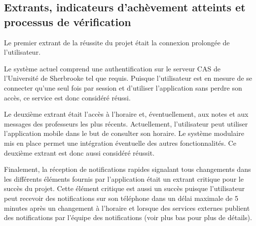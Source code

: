     \pagebreak
    \subsection{Extrants, indicateurs d'achèvement atteints et processus de vérification}
    Le premier extrant de la réussite du projet était la connexion prolongée de l'utilisateur.

    Le système actuel comprend une authentification sur le serveur CAS de l'Université de Sherbrooke tel que requis. Puisque l'utilisateur est en mesure de se connecter qu'une seul fois par session et d'utiliser l'application sans perdre son accès, ce service est donc considéré réussi.

    Le deuxième extrant était l'accès à l'horaire et, éventuellement, aux notes et aux messages des professeurs les plus récents. Actuellement, l'utilisateur peut utiliser l'application mobile dans le but de consulter son horaire. Le système modulaire mis en place permet une intégration éventuelle des autres fonctionnalités. Ce deuxième extrant est donc aussi considéré réussit.

    Finalement, la réception de notifications rapides signalant tous changements dans les différents éléments fournis par l'application était un extrant critique pour le succès du projet. Cette élément critique est aussi un succès puisque l'utilisateur peut recevoir des notifications sur son téléphone dans un délai maximale de 5 minutes après un changement à l'horaire et lorsque des services externes publient des notifications par l'équipe des notifications (voir plus bas pour plus de détails).